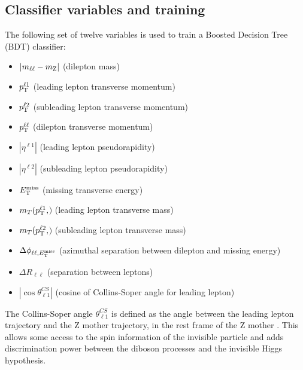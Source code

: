 \subsection{Classifier variables and training} 

The following set of twelve variables is used to train a Boosted Decision Tree (BDT) classifier: 
\begin{itemize}
\item  $\left|m_{\ell\ell}-m_{\mathrm{Z}}\right|$ (dilepton mass) 
\item $p_{\mathrm{T}}^{\ell 1}$ (leading lepton transverse momentum) 
\item $p_{\mathrm{T}}^{\ell 2}$ (subleading lepton transverse momentum)
\item $p_{\mathrm{T}}^{\ell\ell}$ (dilepton transverse momentum)
\item $| \eta^{\ell 1} |$ (leading lepton pseudorapidity)
\item $| \eta^{\ell 2} |$ (subleading lepton pseudorapidity)
\item $E_\mathrm{T}^{\mathrm{miss}}$       (missing transverse energy)
\item $m_{T}(p_{\mathrm{T}}^{\ell 1}, $\met$)$ (leading lepton transverse mass)
\item $m_{T}(p_{\mathrm{T}}^{\ell 2}, $\met$)$ (subleading lepton transverse mass)
\item $\Delta \phi_{\ell\ell,E_\mathrm{T}^{\mathrm{miss}}}$ (azimuthal separation between dilepton and missing energy) 
\item $\Delta R_{\ell\ell}$ (separation between leptons)
\item $| \cos \theta^{CS}_{\ell1} |$ (cosine of Collins-Soper angle for leading lepton)
\end{itemize}

The Collins-Soper angle $\theta^{CS}_{\ell1}$ is defined as the angle between
the leading lepton trajectory and the Z mother trajectory, 
in the rest frame of the Z mother \cite{Collins:1984kg}.
This allows some access to the spin information of the invisible particle and adds discrimination power between the diboson processes and the invisible Higgs hypothesis.


